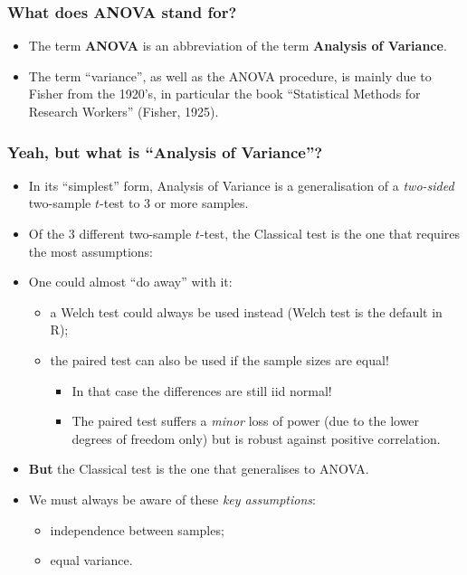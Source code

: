 \documentclass[a4paper]{article}\usepackage[]{graphicx}\usepackage[]{xcolor}
\begin{document}
\subsubsection{What does ANOVA stand for?}
\begin{itemize}
	\item The term \textbf{ANOVA} is an abbreviation of the term \textbf{Analysis of Variance}.
	\item The term ``variance'', as well as the ANOVA procedure, is mainly due to Fisher from the 1920's, in particular the book ``Statistical Methods for Research Workers'' (Fisher, 1925).
\end{itemize}
\subsubsection{Yeah, but what is ``Analysis of Variance''?}
\begin{itemize}
	\item In its ``simplest'' form, Analysis of Variance is a generalisation of a \textit{two-sided} two-sample \( t \)-test to 3 or more samples.
	\item Of the 3 different two-sample \( t \)-test, the Classical test is the one that requires the most assumptions:
	\item One could almost ``do away'' with it:
	\begin{itemize}
		\item a Welch test could always be used instead (Welch test is the default in R);
		\item the paired test can also be used if the sample sizes are equal!
		\begin{itemize}
			\item In that case the differences are still iid normal!
			\item The paired test suffers a \textit{minor} loss of power (due to the lower degrees of freedom only) but is robust against positive correlation.
		\end{itemize}
	\end{itemize}
	\item \textbf{But} the Classical test is the one that generalises to ANOVA.
	\item We must always be aware of these \textit{key assumptions}:
	\begin{itemize}
		\item independence between samples;
		\item equal variance.
	\end{itemize}
\end{itemize}
\end{document}
